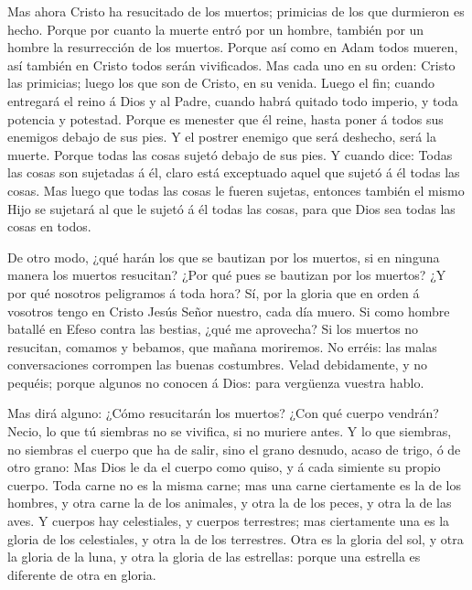  Mas ahora Cristo ha resucitado de los muertos; primicias
de los que durmieron es hecho.  Porque por cuanto la muerte
entró por un hombre, también por un hombre la resurrección de los
muertos.  Porque así como en Adam todos mueren, así también
en Cristo todos serán vivificados.  Mas cada uno en su
orden: Cristo las primicias; luego los que son de Cristo, en su venida.
 Luego el fin; cuando entregará el reino á Dios y al Padre,
cuando habrá quitado todo imperio, y toda potencia y potestad.
 Porque es menester que él reine, hasta poner á todos sus
enemigos debajo de sus pies.  Y el postrer enemigo que será
deshecho, será la muerte.  Porque todas las cosas sujetó
debajo de sus pies. Y cuando dice: Todas las cosas son sujetadas á él,
claro está exceptuado aquel que sujetó á él todas las cosas.
 Mas luego que todas las cosas le fueren sujetas, entonces
también el mismo Hijo se sujetará al que le sujetó á él todas las cosas,
para que Dios sea todas las cosas en todos.

 De otro modo, ¿qué harán los que se bautizan por los
muertos, si en ninguna manera los muertos resucitan? ¿Por qué pues se
bautizan por los muertos?  ¿Y por qué nosotros peligramos á
toda hora?  Sí, por la gloria que en orden á vosotros tengo
en Cristo Jesús Señor nuestro, cada día muero.  Si como
hombre batallé en Efeso contra las bestias, ¿qué me aprovecha? Si los
muertos no resucitan, comamos y bebamos, que mañana moriremos.
 No erréis: las malas conversaciones corrompen las buenas
costumbres.  Velad debidamente, y no pequéis; porque
algunos no conocen á Dios: para vergüenza vuestra hablo.

 Mas dirá alguno: ¿Cómo resucitarán los muertos? ¿Con qué
cuerpo vendrán?  Necio, lo que tú siembras no se vivifica,
si no muriere antes.  Y lo que siembras, no siembras el
cuerpo que ha de salir, sino el grano desnudo, acaso de trigo, ó de otro
grano:  Mas Dios le da el cuerpo como quiso, y á cada
simiente su propio cuerpo.  Toda carne no es la misma
carne; mas una carne ciertamente es la de los hombres, y otra carne la
de los animales, y otra la de los peces, y otra la de las aves.
 Y cuerpos hay celestiales, y cuerpos terrestres; mas
ciertamente una es la gloria de los celestiales, y otra la de los
terrestres.  Otra es la gloria del sol, y otra la gloria de
la luna, y otra la gloria de las estrellas: porque una estrella es
diferente de otra en gloria.

